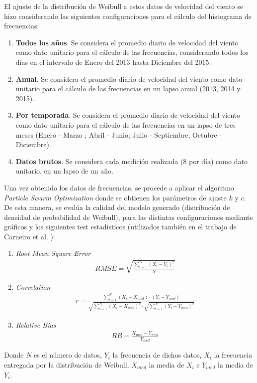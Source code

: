 El ajuste de la distribución de Weibull a estos datos de velocidad del viento se hizo considerando las siguientes configuraciones para el cálculo del
histograma de frecuencias:
\begin{enumerate}
  \item \textbf{Todos los años}. Se considera el promedio diario de velocidad del viento como dato unitario para el cálculo de las frecuencias, considerando
  todos los días en el intervalo de Enero del 2013 hasta Diciembre del 2015.
  \item \textbf{Anual}. Se considera el promedio diario de velocidad del viento como dato unitario para el cálculo de las frecuencias en
  un lapso anual (2013, 2014 y 2015).
  \item \textbf{Por temporada}. Se considera el promedio diario de velocidad del viento como dato unitario para el cálculo de las frecuencias en
  un lapso de tres meses (Enero - Marzo ; Abril - Junio; Julio - Septiembre; Octubre - Diciembre).
  \item \textbf{Datos brutos}. Se considera cada medición realizada (8 por día) como dato unitario, en un lapso de un año.
\end{enumerate}

Una vez obtenido los datos de frecuencias, se procede a aplicar el algoritmo \emph{Particle Swarm Optimization} donde se obtienen los parámetros de ajuste $k$ y $c$. De esta manera, se evalúa la calidad del modelo generado (distribución de densidad de probabilidad de Weibull), para las distintas configuraciones mediante gráficos y los siguientes test estadísticos (utilizados también en el trabajo de Carneiro et al. \cite{Carneiro15}):
\begin{enumerate}
    \item \emph{Root Mean Square Error}
        \begin{align}
            RMSE = \sqrt{\frac{\sum_{i=1}^{N}(X_i - Y_i)^2}{N}}
        \end{align}    
    \item \emph{Correlation}
        \begin{align}
            r = \frac{\sum_{i=1}^{N}(X_i - X_{med})\cdot(Y_i - Y_{med})}{\sqrt{\sum_{i=1}^{N}(X_i - X_{med})^2}\cdot\sqrt{\sum_{i=1}^{N}(Y_i - Y_{med})^2}}
        \end{align}    
    \item \emph{Relative Bias}
        \begin{align}
            RB = \frac{X_{med} - Y_{med}}{Y_{med}}  
        \end{align}    
\end{enumerate}        
Donde $N$ es el número de datos, $Y_i$ la frecuencia de dichos datos, $X_i$ la frecuencia entregada por la distribución de Weibull, $X_{med}$ la media de $X_i$ e $Y_{med}$ la media de $Y_i$. \\

